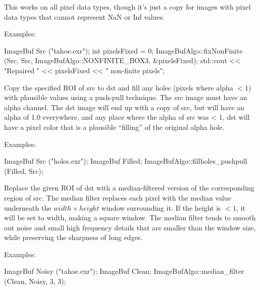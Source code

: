 This works on all pixel data types, though it's just a copy for images with
pixel data types that cannot represent {\cf NaN} or {\cf Inf} values.


\smallskip
\noindent Examples:
\begin{code}
    ImageBuf Src ("tahoe.exr");
    int pixelsFixed = 0;
    ImageBufAlgo::fixNonFinite (Src, Src, ImageBufAlgo::NONFINITE_BOX3,
                                &pixelsFixed);
    std::cout << "Repaired " << pixelsFixed << " non-finite pixels\n";
\end{code}
\apiend


 
Copy the specified ROI of {\cf src} to {\cf dst} and fill any 
holes (pixels where alpha $< 1$) with plausible values using a push-pull
technique.  The {\cf src} image must have
an alpha channel.  The dst image will end up with a copy of src, but
will have an alpha of 1.0 everywhere, and any place where the alpha
of src was < 1, dst will have a pixel color that is a plausible
``filling'' of the original alpha hole.

\smallskip
\noindent Examples:
\begin{code}
    ImageBuf Src ("holes.exr");
    ImageBuf Filled;
    ImageBufAlgo::fillholes_pushpull (Filled, Src);
\end{code}
\apiend


 

Replace the given ROI of {\cf dst} with a median-filtered version of the
corresponding region of {\cf src}.  The median filter replaces each pixel
with the median value underneath the $\mathit{width} \times \mathit{height}$
window surrounding it. If the height is $< 1$, it will be set to width,
making a square window. The median filter tends to smooth out noise and
small high frequency details that are smaller than the window size, while
preserving the sharpness of long edges.

\smallskip
\noindent Examples:
\begin{code}
    ImageBuf Noisy ("tahoe.exr");
    ImageBuf Clean;
    ImageBufAlgo::median_filter (Clean, Noisy, 3, 3);
\end{code}

